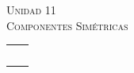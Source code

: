 \documentclass[11pt,a4paper,twocolumn]{article}
\newcommand{\unidad}[2]{\begin{center}
		\fontsize{10}{10}\selectfont\color{gray!50!black}\scshape Unidad #1 \\
		\fontsize{14}{14}\selectfont \scshape #2
\end{center}}
\begin{document}
	\unidad{11}{Componentes Simétricas}
	
	
	\begin{tabular}{r | l} \vspace{.2cm}
		& \\ \vspace{.2cm}
		& \\ \vspace{.2cm}
		& \\ \vspace{.2cm}
		& \\ \vspace{.2cm}
		& \\ 
		
	\end{tabular}
	
	
\end{document}
